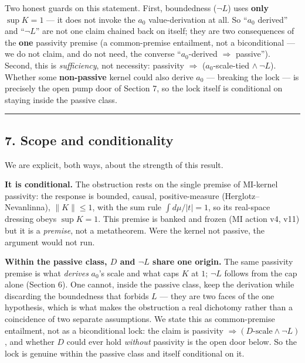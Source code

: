 \documentclass[
]{article}
\begin{document}
Two honest guards on this statement. First, boundedness (\(\lnot L\))
uses \textbf{only} \(\sup K=1\) --- it does not invoke the \(a_0\)
value-derivation at all. So ``\(a_0\) derived'' and ``\(\lnot L\)'' are
not one claim chained back on itself; they are two consequences of the
\textbf{one} passivity premise (a common-premise entailment, not a
biconditional --- we do not claim, and do not need, the converse
``\(a_0\)-derived \(\Rightarrow\) passive''). Second, this is
\emph{sufficiency}, not necessity: passivity \(\Rightarrow\)
(\(a_0\)-scale-tied \(\wedge\ \lnot L\)). Whether some
\textbf{non-passive} kernel could also derive \(a_0\) --- breaking the
lock --- is precisely the open pump door of Section 7, so the lock
itself is conditional on staying inside the passive class.

\begin{center}\rule{0.5\linewidth}{0.5pt}\end{center}

\subsection{7. Scope and conditionality}\label{scope-and-conditionality}

We are explicit, both ways, about the strength of this result.

\textbf{It is conditional.} The obstruction rests on the single premise
of MI-kernel passivity: the response is bounded, causal,
positive-measure (Herglotz--Nevanlinna), \(\|K\|\le1\), with the sum
rule \(\int d\mu/|t|=1\), so its real-space dressing obeys \(\sup K=1\).
This premise is banked and frozen (MI action v4, v11) but it is a
\emph{premise}, not a metatheorem. Were the kernel not passive, the
argument would not run.

\textbf{Within the passive class, \(D\) and \(\lnot L\) share one
origin.} The same passivity premise is what \emph{derives} \(a_0\)'s
scale and what caps \(K\) at \(1\); \(\lnot L\) follows from the cap
alone (Section 6). One cannot, inside the passive class, keep the
derivation while discarding the boundedness that forbids \(L\) --- they
are two faces of the one hypothesis, which is what makes the obstruction
a real dichotomy rather than a coincidence of two separate assumptions.
We state this as common-premise entailment, not as a biconditional lock:
the claim is passivity \(\Rightarrow(D\text{-scale}\wedge\lnot L)\), and
whether \(D\) could ever hold \emph{without} passivity is the open door
below. So the lock is genuine within the passive class and itself
conditional on it.
\end{document}
